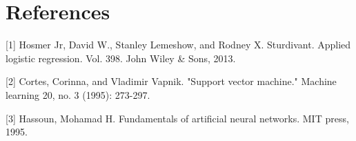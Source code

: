 \documentclass{article}
\begin{document}
\section*{References}
\medskip
\small

[1] Hosmer Jr, David W., Stanley Lemeshow, and Rodney X. Sturdivant. Applied logistic regression. Vol. 398. John Wiley \& Sons, 2013.

[2] Cortes, Corinna, and Vladimir Vapnik. "Support vector machine." Machine learning 20, no. 3 (1995): 273-297.

[3] Hassoun, Mohamad H. Fundamentals of artificial neural networks. MIT press, 1995.
\end{document}
